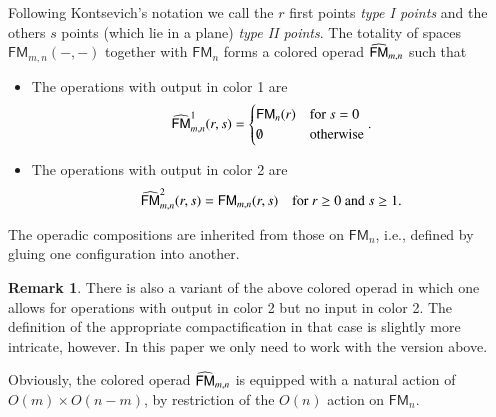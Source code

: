 \documentclass[a4paper]{amsart}
\theoremstyle{plain}
\theoremstyle{definition}
\newtheorem{rem}[thm]{Remark}
\newcommand{\op}{\mathcal}
\newcommand{\FM}{\mathsf{FM}}
\begin{document}
Following Kontsevich's notation we call the $r$ first points \emph{type I points} and the others $s$ points (which lie in a plane) \emph{type II points}.
The totality of spaces $\FM_{m,n}(-,-)$ together with $\FM_n$ forms a colored operad $\hFM_{m,n}$ such that
\begin{itemize}
\item The operations with output in color 1 are
\[
\hFM_{m,n}^1(r,s)=
\begin{cases}
\FM_n(r) & \text{for $s=0$} \\
\emptyset & \text{otherwise}
\end{cases}.
\]
\item The operations with output in color 2 are
\[
\hFM_{m,n}^2(r,s)=
\FM_{m,n}(r,s) \quad \text{for $r\geq 0$ and $s\geq 1$}.
\]
\end{itemize}
The operadic compositions are inherited from those on $\FM_n$, i.e., defined by gluing one configuration into another.

\begin{rem}
There is also a variant of the above colored operad in which one allows for operations with output in color 2 but no input in color 2.
The definition of the appropriate compactification in that case is slightly more intricate, however. In this paper we only need to work with the version above.
\end{rem}

Obviously, the colored operad $\hFM_{m,n}$ is equipped with a natural action of $O(m)\times O(n-m)$, by restriction of the $O(n)$ action on $\FM_n$.


% 


\end{document}
